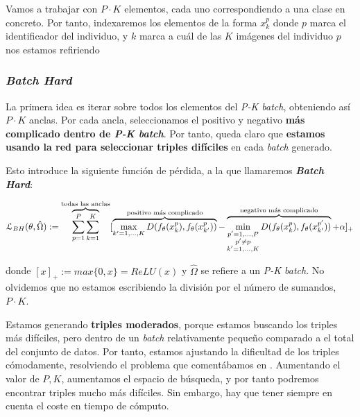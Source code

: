\begin{observacion}

    Vamos a trabajar con $P \cdot K$ elementos, cada uno correspondiendo a una clase en concreto. Por tanto, indexaremos los elementos de la forma $x_k^p$ donde $p$ marca el identificador del individuo, y $k$ marca a cuál de las $K$ imágenes del individuo $p$ nos estamos refiriendo

\end{observacion}

\subsubsection{\textit{Batch Hard}} \label{isubsubs:batch_hard}

La primera idea es iterar sobre todos los elementos del \textit{P-K batch}, obteniendo así $P \cdot K$ anclas. Por cada ancla, seleccionamos el positivo y negativo \textbf{más complicado dentro de \textit{P-K batch}}. Por tanto, queda claro que \textbf{estamos usando la red para seleccionar triples difíciles} en cada \textit{batch} generado.

Esto introduce la siguiente función de pérdida, a la que llamaremos \textbf{\textit{Batch Hard}}:

\begin{equation}
    \mathcal{L}_{BH}(\theta, \hat{\Omega}) := \overbrace{\sum_{p = 1}^P \sum_{k = 1}^K}^\textrm{\text{todas las anclas}} [
        \overbrace{\max_{k' = 1, \ldots, K} D(f_{\theta}(x_k^p), f_{\theta}(x_{k'}^p))}^\textrm{\text{positivo más complicado}}
        - \overbrace{\min_{\substack{p' = 1, \ldots, P \\ p' \neq p \\ k' = 1, \ldots, K}} D(f_{\theta}(x_k^p), f_{\theta}(x_{k'}^{p'}))}^\textrm{\text{negativo más complicado}}
        + \alpha]_+
\end{equation}

donde $[x]_+ := max \{0, x\} = ReLU(x)$ y $\hat{\Omega}$ se refiere a un \textit{P-K batch}. No olvidemos que no estamos escribiendo la división por el número de sumandos, $P \cdot K$.

Estamos generando \textbf{triples moderados}, porque estamos buscando los triples más difíciles, pero dentro de un \textit{batch} relativamente pequeño comparado a el total del conjunto de datos. Por tanto, estamos ajustando la dificultad de los triples cómodamente, resolviendo el problema que comentábamos en . Aumentando el valor de $P, K$, aumentamos el espacio de búsqueda, y por tanto podremos encontrar triples mucho más difíciles. Sin embargo, hay que tener siempre en cuenta el coste en tiempo de cómputo.


